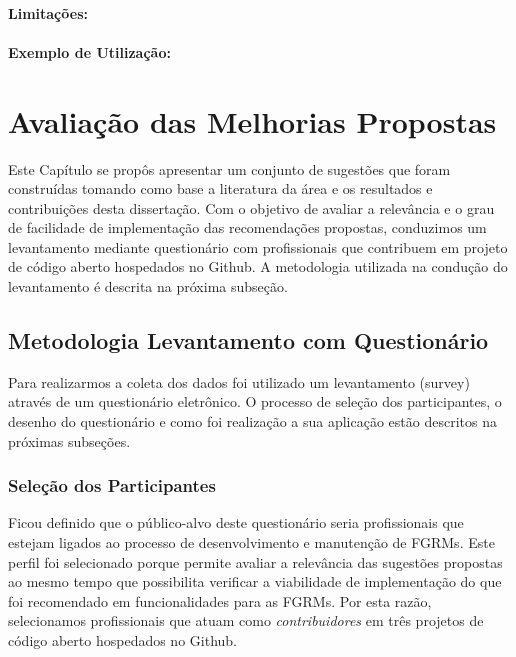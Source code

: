 \paragraph{Limitações:}
\label{par:limitacoes_s09}

\paragraph{Exemplo de Utilização:}
\label{par:exemplo_de_utilização_s09}



\section{Avaliação das Melhorias Propostas}
\label{sec:sug_melhoria_avaliacao_das_melhorias}

Este Capítulo se propôs apresentar um conjunto de sugestões que foram
construídas tomando como base a literatura da área e os resultados e
contribuições desta dissertação. Com o objetivo de avaliar a relevância e o grau
de facilidade de implementação das recomendações propostas, conduzimos um
levantamento mediante questionário com profissionais que contribuem em projeto
de código aberto hospedados no Github. A metodologia utilizada na condução do
levantamento é descrita na próxima subseção.

\subsection{Metodologia Levantamento com Questionário}
\label{sub:sug_melhoria_metodologia_levantamento}

Para realizarmos a coleta dos dados foi utilizado um levantamento (survey)
através de um questionário eletrônico. O processo de seleção dos participantes,
o desenho do questionário e como foi realização a sua aplicação estão descritos
na próximas subseções.

\subsubsection{Seleção dos Participantes}
\label{ssub:sug_melhoria_selecao_participantes}

Ficou definido que o público-alvo deste questionário seria profissionais que
estejam ligados ao processo de desenvolvimento e manutenção de FGRMs. Este
perfil foi selecionado porque permite avaliar a relevância das sugestões
propostas ao mesmo tempo que possibilita verificar a viabilidade de
implementação do que foi recomendado em funcionalidades para as FGRMs. Por esta
razão, selecionamos profissionais que atuam como \textit{contribuidores} em três
projetos de código aberto hospedados no Github.

